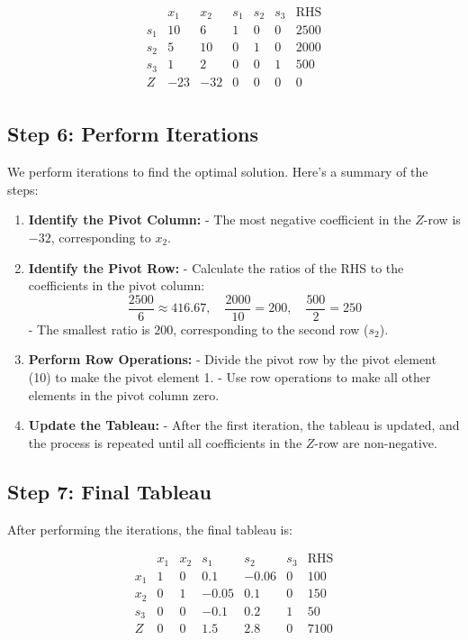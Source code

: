 \documentclass{article}
\begin{document}
\[
\begin{array}{cccccc|c}
 & x_1 & x_2 & s_1 & s_2 & s_3 & \text{RHS} \\
\hline
s_1 & 10 & 6 & 1 & 0 & 0 & 2500 \\
s_2 & 5 & 10 & 0 & 1 & 0 & 2000 \\
s_3 & 1 & 2 & 0 & 0 & 1 & 500 \\
\hline
Z & -23 & -32 & 0 & 0 & 0 & 0 \\
\end{array}
\]

\subsection*{Step 6: Perform Iterations}
We perform iterations to find the optimal solution. Here’s a summary of the steps:

\begin{enumerate}
    \item \textbf{Identify the Pivot Column:}
    - The most negative coefficient in the \( Z \)-row is \(-32\), corresponding to \( x_2 \).
    
    \item \textbf{Identify the Pivot Row:}
    - Calculate the ratios of the RHS to the coefficients in the pivot column:
    \[
    \frac{2500}{6} \approx 416.67, \quad \frac{2000}{10} = 200, \quad \frac{500}{2} = 250
    \]
    - The smallest ratio is \( 200 \), corresponding to the second row (\( s_2 \)).
    
    \item \textbf{Perform Row Operations:}
    - Divide the pivot row by the pivot element (10) to make the pivot element 1.
    - Use row operations to make all other elements in the pivot column zero.
    
    \item \textbf{Update the Tableau:}
    - After the first iteration, the tableau is updated, and the process is repeated until all coefficients in the \( Z \)-row are non-negative.
\end{enumerate}

\subsection*{Step 7: Final Tableau}
After performing the iterations, the final tableau is:

\[
\begin{array}{cccccc|c}
 & x_1 & x_2 & s_1 & s_2 & s_3 & \text{RHS} \\
\hline
x_1 & 1 & 0 & 0.1 & -0.06 & 0 & 100 \\
x_2 & 0 & 1 & -0.05 & 0.1 & 0 & 150 \\
s_3 & 0 & 0 & -0.1 & 0.2 & 1 & 50 \\
\hline
Z & 0 & 0 & 1.5 & 2.8 & 0 & 7100 \\
\end{array}
\]
\end{document}
